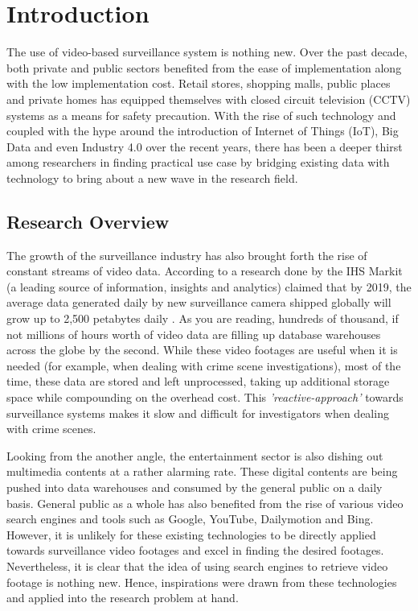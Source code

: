 \chapter{Introduction}
The use of video-based surveillance system is nothing new. Over the past decade, both private and public sectors benefited from the ease of implementation along with the low implementation cost.
Retail stores, shopping malls, public places and private homes has equipped themselves with closed circuit television (CCTV) systems as a means for safety precaution.
With the rise of such technology and coupled with the hype around the introduction of Internet of Things (IoT), Big Data and even Industry 4.0 over the recent years, there has been a deeper thirst among researchers in finding practical use case by bridging existing data with technology to bring about a new wave in the research field.

\section{Research Overview}
\label{section:introduction}

The growth of the surveillance industry has also brought forth the rise of constant streams of video data. According to a research done by the IHS Markit (a leading source of information, insights and analytics) claimed that by 2019, the average data generated daily by new surveillance camera shipped globally will grow up to 2,500 petabytes daily \cite{woodhouse2016big}.
As you are reading, hundreds of thousand, if not millions of hours worth of video data are filling up database warehouses across the globe by the second. While these video footages are useful when it is needed (for example, when dealing with crime scene investigations), most of the time, these data are stored and left unprocessed, taking up additional storage space while compounding on the overhead cost.
This \textit{'reactive-approach'} towards surveillance systems makes it slow and difficult for investigators when dealing with crime scenes.

Looking from the another angle, the entertainment sector is also dishing out multimedia contents at a rather alarming rate. These digital contents are being pushed into data warehouses and consumed by the general public on a daily basis. General public as a whole has also benefited from the rise of various video search engines and tools such as Google, YouTube, Dailymotion and Bing. However, it is unlikely for these existing technologies to be directly applied towards surveillance video footages and excel in finding the desired footages. Nevertheless, it is clear that the idea of using search engines to retrieve video footage is nothing new. Hence, inspirations were drawn from these technologies and applied into the research problem at hand. %

